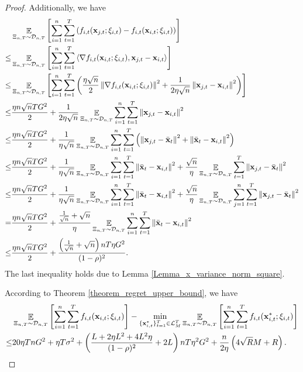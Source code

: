 \documentclass{article}
\begin{document}
\begin{proof}
Additionally, we have
\begin{align}
\nonumber
& \mathop{\mathbb{E}}_{\Xi_{n,T} \sim \mathcal{D}_{n,T}}\left [\sum_{i=1}^n \sum_{t=1}^T \left( f_{i,t}({\bf x}_{j,t};\xi_{i,t}) - f_{i,t}({\bf x}_{i,t};\xi_{i,t}) \right)\right ] \\ \nonumber
\le & \mathop{\mathbb{E}}_{\Xi_{n,T} \sim \mathcal{D}_{n,T}}\left [\sum_{i=1}^n \sum_{t=1}^T \left\langle\nabla f_{i,t}({\bf x}_{i,t};\xi_{i,t}), {\bf x}_{j,t} - {\bf x}_{i,t} \right\rangle\right ] \\ \nonumber
\le & \mathop{\mathbb{E}}_{\Xi_{n,T} \sim \mathcal{D}_{n,T}}\left [\sum_{i=1}^n \sum_{t=1}^T \left(  \frac{\eta\sqrt{n}}{2}\left\lVert\nabla f_{i,t}({\bf x}_{i,t};\xi_{i,t})\right\rVert^2 + \frac{1}{2\eta\sqrt{n}} \left\lVert{\bf x}_{j,t} - {\bf x}_{i,t}\right\rVert^2  \right)\right ] \\ \nonumber
\le & \frac{\eta n\sqrt{n} T G^2}{2} + \frac{1}{2\eta\sqrt{n}} \mathop{\mathbb{E}}_{\Xi_{n,T} \sim \mathcal{D}_{n,T}}\sum_{i=1}^n \sum_{t=1}^T \left\lVert{\bf x}_{j,t} - {\bf x}_{i,t}\right\rVert^2 \\ \nonumber
\le & \frac{\eta n\sqrt{n} T G^2}{2} + \frac{1}{\eta\sqrt{n}} \mathop{\mathbb{E}}_{\Xi_{n,T} \sim \mathcal{D}_{n,T}}\sum_{i=1}^n \sum_{t=1}^T \left(  \left\lVert{\bf x}_{j,t} -\bar{{\bf x}}_t\right\rVert^2 + \left\lVert\bar{{\bf x}}_t - {\bf x}_{i,t}\right\rVert^2 \right) \\ \nonumber
\le & \frac{\eta n\sqrt{n} T G^2}{2} + \frac{1}{\eta\sqrt{n}} \mathop{\mathbb{E}}_{\Xi_{n,T} \sim \mathcal{D}_{n,T}}\sum_{i=1}^n \sum_{t=1}^T \left\lVert\bar{{\bf x}}_t - {\bf x}_{i,t}\right\rVert^2 + \frac{\sqrt{n}}{\eta} \mathop{\mathbb{E}}_{\Xi_{n,T} \sim \mathcal{D}_{n,T}} \sum_{t=1}^T\left\lVert{\bf x}_{j,t} -\bar{{\bf x}}_t\right\rVert^2  \\ \nonumber
\le & \frac{\eta n\sqrt{n} T G^2}{2} + \frac{1}{\eta\sqrt{n}} \mathop{\mathbb{E}}_{\Xi_{n,T} \sim \mathcal{D}_{n,T}}\sum_{i=1}^n \sum_{t=1}^T \left\lVert\bar{{\bf x}}_t - {\bf x}_{i,t}\right\rVert^2 + \frac{\sqrt{n}}{\eta} \mathop{\mathbb{E}}_{\Xi_{n,T} \sim \mathcal{D}_{n,T}} \sum_{j=1}^n\sum_{t=1}^T\left\lVert{\bf x}_{j,t} -\bar{{\bf x}}_t\right\rVert^2  \\ \nonumber
= & \frac{\eta n\sqrt{n} T G^2}{2} + \frac{\frac{1}{\sqrt{n}}+\sqrt{n}}{\eta} \mathop{\mathbb{E}}_{\Xi_{n,T} \sim \mathcal{D}_{n,T}}\sum_{i=1}^n \sum_{t=1}^T \left\lVert\bar{{\bf x}}_t - {\bf x}_{i,t}\right\rVert^2 \\ \label{equa_implied_other_regret_temp1}
\le & \frac{\eta n\sqrt{n} T G^2}{2} + \frac{\left( \frac{1}{\sqrt{n}}+\sqrt{n} \right)nT\eta G^2}{(1-\rho)^2}. 
\end{align} The last inequality holds due to Lemma \ref{Lemma_x_variance_norm_square}.

According to Theorem \ref{theorem_regret_upper_bound}, we have
\begin{align}
\nonumber
& \mathop{\mathbb{E}}_{\Xi_{n,T} \sim \mathcal{D}_{n,T}}\left [\sum_{i=1}^n \sum_{t=1}^T f_{i,t}({\bf x}_{i,t};\xi_{i,t})\right ] - \min_{\{{\bf x}_{i,t}^\ast\}_{t=1}^T \in {\mathcal{L}}_M^T} \mathop{\mathbb{E}}_{\Xi_{n,T} \sim \mathcal{D}_{n,T}} \left [\sum_{i=1}^n \sum_{t=1}^T f_{i,t}({\bf x}_{i,t}^\ast;\xi_{i,t})\right ] \\ \label{equa_implied_other_regret_temp2}
\le & 20\eta T n G^2 +  \eta T\sigma^2 + \left( \frac{L + 2\eta L^2  + 4L^2 \eta}{(1-\rho)^2} +2L \right)  nT\eta^2 G^2    + \frac{n}{2\eta}\left(  4\sqrt{R}M + R   \right).
\end{align}


\end{proof}
\end{document}
